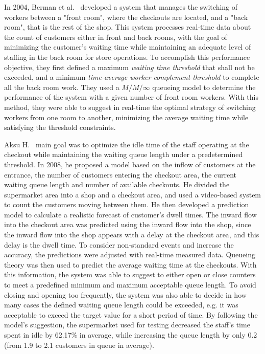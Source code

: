 In 2004, Berman et al.~\cite{berman} developed a system that manages the switching of workers between a "front room", where the checkouts are located, and a "back room", that is the rest of the shop. This system processes real-time data about the count of customers either in front and back rooms, with the goal of minimizing the customer's waiting time while maintaining an adequate level of staffing in the back room for store operations. To accomplish this performance objective, they first defined a maximum \emph{waiting time threshold} that shall not be exceeded, and a minimum \emph{time-average worker complement threshold} to complete all the back room work. They used a \( M/M/\infty \) queueing model to determine the performance of the system with a given number of front room workers. With this method, they were able to suggest in real-time the optimal strategy of switching workers from one room to another, minimizing the average waiting time while satisfying the threshold constraints.

Aksu H.~\cite{aksu} main goal was to optimize the idle time of the staff operating at the checkout while maintaining the waiting queue length under a predetermined threshold. In 2008, he proposed a model based on the inflow of customers at the entrance, the number of customers entering the checkout area, the current waiting queue length and number of available checkouts. He divided the supermarket area into a shop and a checkout area, and used a video-based system to count the customers moving between them. He then developed a prediction model to calculate a realistic forecast of customer's dwell times. The inward flow into the checkout area was predicted using the inward flow into the shop, since the inward flow into the shop appears with a delay at the checkout area, and this delay is the dwell time. To consider non-standard events and increase the accuracy, the predictions were adjusted with real-time measured data. Queueing theory was then used to predict the average waiting time at the checkouts. With this information, the system was able to suggest to either open or close counters to meet a predefined minimum and maximum acceptable queue length. To avoid closing and opening too frequently, the system was also able to decide in how many cases the defined waiting queue length could be exceeded, e.g. it was acceptable to exceed the target value for a short period of time. By following the model’s suggestion, the supermarket used for testing decreased the staff’s time spent in idle by 62.17\% in average, while increasing the queue length by only 0.2 (from 1.9 to 2.1 customers in queue in average).

